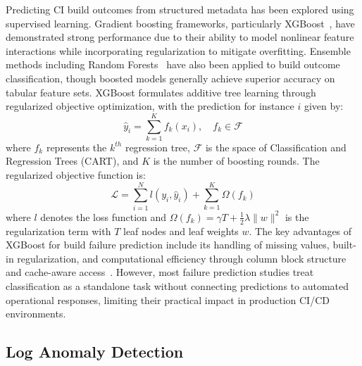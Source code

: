\documentclass[a4paper,fleqn]{cas-dc}
\begin{document}
Predicting CI build outcomes from structured metadata has been explored using supervised learning.
Gradient boosting frameworks, particularly XGBoost~\citep{chen2016xgboost}, have demonstrated strong performance due to their ability to model nonlinear feature interactions while incorporating regularization to mitigate overfitting.
Ensemble methods including Random Forests~\citep{breiman2001random} have also been applied to build outcome classification, though boosted models generally achieve superior accuracy on tabular feature sets.
XGBoost formulates additive tree learning through regularized objective optimization, with the prediction for instance $i$ given by:
\begin{equation}
\hat{y}_i = \sum_{k=1}^{K} f_k(x_i), \quad f_k \in \mathcal{F}
\end{equation}
where $f_k$ represents the $k^{th}$ regression tree, $\mathcal{F}$ is the space of Classification and Regression Trees (CART), and $K$ is the number of boosting rounds.
The regularized objective function is:
\begin{equation}
\mathcal{L} = \sum_{i=1}^{N} l(y_i, \hat{y}_i) + \sum_{k=1}^{K} \Omega(f_k)
\end{equation}
where $l$ denotes the loss function and $\Omega(f_k) = \gamma T + \frac{1}{2}\lambda\|w\|^2$ is the regularization term with $T$ leaf nodes and leaf weights $w$.
The key advantages of XGBoost for build failure prediction include its handling of missing values, built-in regularization, and computational efficiency through column block structure and cache-aware access~\citep{chen2016xgboost}.
However, most failure prediction studies treat classification as a standalone task without connecting predictions to automated operational responses, limiting their practical impact in production CI/CD environments.

\subsection{Log Anomaly Detection}\label{subsec:loganomalyrelated}
\end{document}
